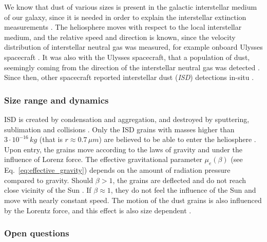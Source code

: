We know that dust of various sizes is present in the galactic interstellar medium of our galaxy, since it is needed in order to explain the interstellar extinction measurements \citep{desert1990interstellar}. The heliosphere moves with respect to the local interstellar medium, and the relative speed and direction is known, since the velocity distribution of interstellar neutral gas was measured, for example onboard Ulysses spacecraft \citep{witte2004kinetic}. It was also with the Ulysses spacecraft, that a population of dust, seemingly coming from the direction of the interstellar neutral gas was detected \citep{grun1993discovery}. Since then, other spacecraft reported interstellar dust (\textit{ISD}) detections in-situ \citep{zaslavsky2012interplanetary,malaspina2014interplanetary}. 

\subsubsection{Size range and dynamics}

ISD is created by condensation and aggregation, and destroyed by sputtering, sublimation and collisions \citep{mann2010interstellar}. Only the ISD grains with masses higher than $3\cdot 10^{-16} \, \si{kg}$ (that is $r \approx 0.7 \, \si{\mu m} $) are believed to be able to enter the heliosphere \citep{kimura1998electric}. Upon entry, the grains move according to the laws of gravity and under the influence of Lorenz force. The effective gravitational parameter $\mu_e(\beta)$ (see Eq.~\ref{eq:effective_gravity}) depends on the amount of radiation pressure compared to gravity. Should $\beta > 1$, the grains are deflected and do not reach close vicinity of the Sun \citep{henriksen2022interstellar}. If $\beta \approx 1$, they do not feel the influence of the Sun and move with nearly constant speed. The motion of the dust grains is also influenced by the Lorentz force, and this effect is also size dependent \citep{morfill1979motion}.

\subsubsection{Open questions}

